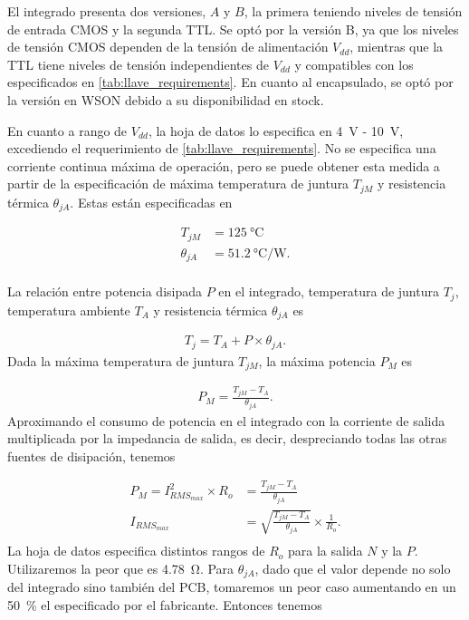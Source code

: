 El integrado presenta dos versiones, $A$ y $B$, la primera teniendo niveles de
tensión de entrada CMOS y la segunda TTL.  Se optó por la versión B, ya que los
niveles de tensión CMOS dependen de la tensión de alimentación $V_{dd}$,
mientras que la TTL tiene niveles de tensión independientes de $V_{dd}$ y
compatibles con los especificados en \ref{tab:llave_requirements}. En cuanto al
encapsulado, se optó por la versión en WSON debido a su disponibilidad en
stock.

En cuanto a rango de $V_{dd}$, la hoja de datos lo especifica en \qty{4}{\volt}
- \qty{10}{\volt}, excediendo el requerimiento de \ref{tab:llave_requirements}.
No se especifica una corriente continua máxima de operación, pero se puede
obtener esta medida a partir de la especificación de máxima temperatura de
juntura $T_{jM}$ y resistencia térmica $\theta_{jA}$. Estas están especificadas en

\begin{equation}
    \begin{aligned}
        T_{jM} & = \qty{125}{\celsius} \\
        \theta_{jA} &= \qty[per-mode=fraction]{51.2}{\celsius\per\watt}. \\
    \end{aligned}
\end{equation}

La relación entre potencia disipada $P$ en el integrado, temperatura de juntura
$T_j$, temperatura ambiente $T_A$ y resistencia térmica $\theta_{jA}$ es

\begin{equation}
    \begin{aligned}
        T_{j} = T_{A} + P \times \theta_{jA}.
    \end{aligned}
\end{equation}
Dada la máxima temperatura de juntura $T_{jM}$, la máxima potencia $P_M$ es

\begin{equation}
    \begin{aligned}
        P_{M} = \frac{T_{jM}-T_A}{\theta_{jA}}.
    \end{aligned}
\end{equation}
Aproximando el consumo de potencia en el integrado con la corriente de salida
multiplicada por la impedancia de salida, es decir, despreciando todas las otras
fuentes de disipación, tenemos

\begin{equation}
    \begin{aligned}
        P_{M} = I_{RMS_{max}}^2 \times R_o &= \frac{T_{jM}-T_A}{\theta_{jA}} \\
        I_{RMS_{max}} &= \sqrt{\frac{T_{jM}-T_A}{\theta_{jA}}} \times
        \frac{1}{R_o}. \\
    \end{aligned}
\end{equation}
La hoja de datos especifica distintos rangos de $R_o$ para la salida $N$ y la
$P$. Utilizaremos la peor que es \qty{4.78}{\ohm}. Para $\theta_{jA}$, dado que
el valor depende no solo del integrado sino también del PCB, tomaremos un peor
caso aumentando en un \qty{50}{\percent} el especificado por el fabricante.
Entonces tenemos


